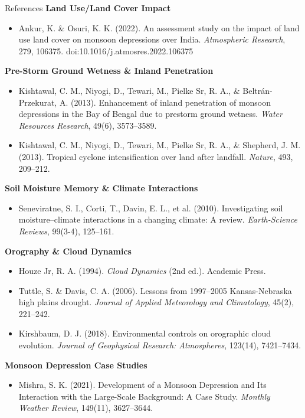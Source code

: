 \documentclass[10pt, aspectratio=169,t,xcolor=table]{beamer}
\begin{document}
\begin{frame}[allowframebreaks]{References}
	\textbf{Land Use/Land Cover Impact}
	\begin{itemize}\scriptsize
		\item Ankur, K. \& Osuri, K. K. (2022). An assessment study on the impact of land use land cover on monsoon depressions over India. \textit{Atmospheric Research}, 279, 106375. doi:10.1016/j.atmosres.2022.106375
	\end{itemize}

	\textbf{Pre-Storm Ground Wetness \& Inland Penetration}
	\begin{itemize}\scriptsize
		\item Kishtawal, C. M., Niyogi, D., Tewari, M., Pielke Sr, R. A., \& Beltrán-Przekurat, A. (2013). Enhancement of inland penetration of monsoon depressions in the Bay of Bengal due to prestorm ground wetness. \textit{Water Resources Research}, 49(6), 3573–3589.

		\item Kishtawal, C. M., Niyogi, D., Tewari, M., Pielke Sr, R. A., \& Shepherd, J. M. (2013). Tropical cyclone intensification over land after landfall. \textit{Nature}, 493, 209–212.
	\end{itemize}

	\textbf{Soil Moisture Memory \& Climate Interactions}
	\begin{itemize}\scriptsize
		\item Seneviratne, S. I., Corti, T., Davin, E. L., et al. (2010). Investigating soil moisture–climate interactions in a changing climate: A review. \textit{Earth-Science Reviews}, 99(3-4), 125–161.
	\end{itemize}

	\textbf{Orography \& Cloud Dynamics}
	\begin{itemize}\scriptsize
		\item Houze Jr, R. A. (1994). \textit{Cloud Dynamics} (2nd ed.). Academic Press.

		\item Tuttle, S. \& Davis, C. A. (2006). Lessons from 1997–2005 Kansas-Nebraska high plains drought. \textit{Journal of Applied Meteorology and Climatology}, 45(2), 221–242.

		\item Kirshbaum, D. J. (2018). Environmental controls on orographic cloud evolution. \textit{Journal of Geophysical Research: Atmospheres}, 123(14), 7421–7434.
	\end{itemize}

	\textbf{Monsoon Depression Case Studies}
	\begin{itemize}\scriptsize
		\item Mishra, S. K. (2021). Development of a Monsoon Depression and Its Interaction with the Large-Scale Background: A Case Study. \textit{Monthly Weather Review}, 149(11), 3627–3644.
	\end{itemize}

\end{frame}
\end{document}
